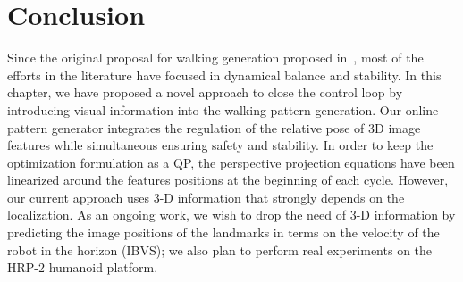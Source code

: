 \section{Conclusion}
\label{sec:conclusions}
Since the original proposal for walking generation proposed in~\citep{Kajita2003}, most of the efforts in the literature have focused in dynamical balance and stability. In this chapter, we have proposed a novel approach to close the control loop by introducing visual information into the walking pattern generation. Our online pattern generator integrates the regulation of the relative pose of 3D image features while simultaneous ensuring safety and stability. In order to keep the optimization formulation as a QP, the perspective projection equations have been linearized around the features positions at the beginning of each cycle. However, our current approach uses 3-D information that strongly depends on the localization. As an ongoing work, we wish to drop the need of 3-D information by predicting the image positions of the landmarks in terms on the velocity of the robot in the horizon (IBVS); we also plan to perform real experiments on the HRP-2 humanoid platform.
